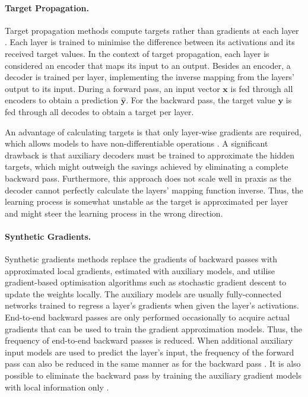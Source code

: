 \paragraph{Target Propagation.} Target propagation methods compute targets rather than gradients at each layer .
Each layer is trained to minimise the difference between its activations and its received target values.
In the context of target propagation, each layer is considered an encoder that maps its input to an output. Besides an encoder, a decoder is trained per layer, implementing the inverse mapping from the layers' output to its input.
During a forward pass, an input vector $\boldsymbol{x}$ is fed through all encoders to obtain a prediction $\boldsymbol{\hat{y}}$. For the backward pass, the target value $\boldsymbol{y}$ is fed through all decodes to obtain a target per layer.


An advantage of calculating targets is that only layer-wise gradients are required, which allows models to have non-differentiable operations \cite{appice_difference_2015}.
A significant drawback is that auxiliary decoders must be trained to approximate the hidden targets, which might outweigh the savings achieved by eliminating a complete backward pass.
Furthermore, this approach does not scale well in praxis  as the decoder cannot perfectly calculate the layers' mapping function inverse. 
Thus, the learning process is somewhat unstable as the target is approximated per layer and might steer the learning process in the wrong direction.


\paragraph{Synthetic Gradients.} Synthetic gradients methods  replace the gradients of backward passes with approximated local gradients, estimated with auxiliary models, and utilise gradient-based optimisation algorithms such as stochastic gradient descent to update the weights locally.
The auxiliary models are usually fully-connected networks trained to regress a layer's gradients when given the layer's activations.
End-to-end backward passes are only performed occasionally to acquire actual gradients that can be used to train the gradient approximation models.
Thus, the frequency of end-to-end backward passes is reduced.
When additional auxiliary input models are used to predict the layer's input, the frequency of the forward pass can also be reduced in the same manner as for the backward pass .
It is also possible to eliminate the backward pass by training the auxiliary gradient models with local information only .

